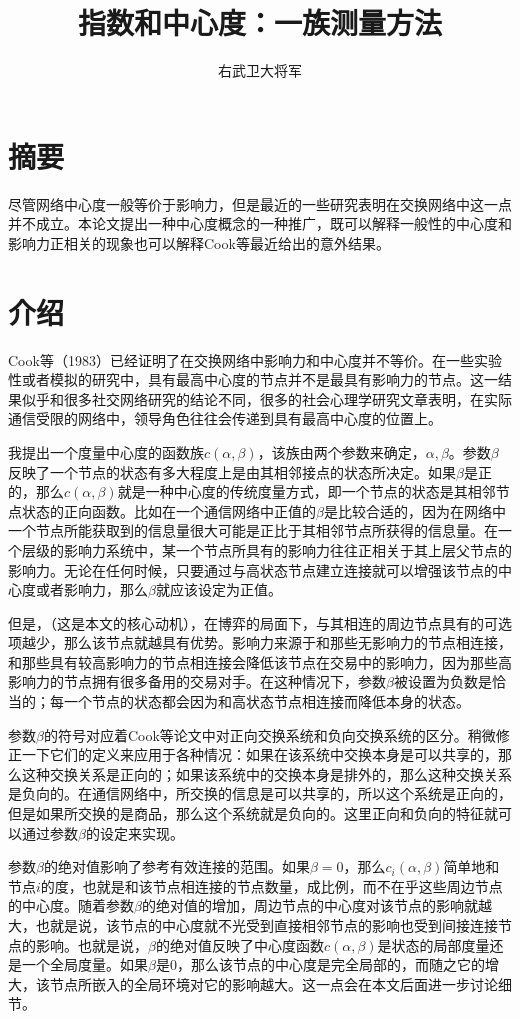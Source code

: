 \documentclass{ctexart}
\author{右武卫大将军}
\title{指数和中心度：一族测量方法}
\begin{document}
    \maketitle
    \section{摘要}
        尽管网络中心度一般等价于影响力，但是最近的一些研究表明在交换网络中这一点并不成立。本论文提出一种中心度概念的一种推广，既可以解释一般性的中心度和影响力正相关的现象也可以解释Cook等最近给出的意外结果。
    \section{介绍}
        Cook等（1983）已经证明了在交换网络中影响力和中心度并不等价。在一些实验性或者模拟的研究中，具有最高中心度的节点并不是最具有影响力的节点。这一结果似乎和很多社交网络研究的结论不同，很多的社会心理学研究文章表明，在实际通信受限的网络中，领导角色往往会传递到具有最高中心度的位置上。
        
        我提出一个度量中心度的函数族$c(\alpha,\beta)$，该族由两个参数来确定，$\alpha,\beta$。参数$\beta$反映了一个节点的状态有多大程度上是由其相邻接点的状态所决定。如果$\beta$是正的，那么$c(\alpha,\beta)$就是一种中心度的传统度量方式，即一个节点的状态是其相邻节点状态的正向函数。比如在一个通信网络中正值的$\beta$是比较合适的，因为在网络中一个节点所能获取到的信息量很大可能是正比于其相邻节点所获得的信息量。在一个层级的影响力系统中，某一个节点所具有的影响力往往正相关于其上层父节点的影响力。无论在任何时候，只要通过与高状态节点建立连接就可以增强该节点的中心度或者影响力，那么$\beta$就应该设定为正值。
        
        但是，（这是本文的核心动机），在博弈的局面下，与其相连的周边节点具有的可选项越少，那么该节点就越具有优势。影响力来源于和那些无影响力的节点相连接，和那些具有较高影响力的节点相连接会降低该节点在交易中的影响力，因为那些高影响力的节点拥有很多备用的交易对手。在这种情况下，参数$\beta$被设置为负数是恰当的；每一个节点的状态都会因为和高状态节点相连接而降低本身的状态。
        
        参数$\beta$的符号对应着Cook等论文中对正向交换系统和负向交换系统的区分。稍微修正一下它们的定义来应用于各种情况：如果在该系统中交换本身是可以共享的，那么这种交换关系是正向的；如果该系统中的交换本身是排外的，那么这种交换关系是负向的。在通信网络中，所交换的信息是可以共享的，所以这个系统是正向的，但是如果所交换的是商品，那么这个系统就是负向的。这里正向和负向的特征就可以通过参数$\beta$的设定来实现。
        
        参数$\beta$的绝对值影响了参考有效连接的范围。如果$\beta=0$，那么$c_i(\alpha,\beta)$简单地和节点$i$的度，也就是和该节点相连接的节点数量，成比例，而不在乎这些周边节点的中心度。随着参数$\beta$的绝对值的增加，周边节点的中心度对该节点的影响就越大，也就是说，该节点的中心度就不光受到直接相邻节点的影响也受到间接连接节点的影响。也就是说，$\beta$的绝对值反映了中心度函数$c(\alpha,\beta)$是状态的局部度量还是一个全局度量。如果$\beta$是0，那么该节点的中心度是完全局部的，而随之它的增大，该节点所嵌入的全局环境对它的影响越大。这一点会在本文后面进一步讨论细节。
        
\end{document}
